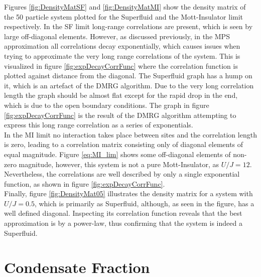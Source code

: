 Figures \ref{fig:DensityMatSF} and \ref{fig:DensityMatMI} show the density matrix of the 50 particle system plotted for the Superfluid and the Mott-Insulator limit respectively. In the SF limit long-range correlations are present, which is seen by large off-diagonal elements. However, as discussed previously, in the MPS approximation all correlations decay exponentially, which causes issues when trying to approximate the very long range correlations of the system. This is visualized in figure \ref{fig:expDecayCorrFunc} where the correlation function is plotted against distance from the diagonal. The Superfluid graph has a hump on it, which is an artefact of the DMRG algorithm. Due to the very long correlation length the graph should be almost flat except for the rapid drop in the end, which is due to the open boundary conditions. The graph in figure \ref{fig:expDecayCorrFunc} is the result of the DMRG algorithm attempting to express this long range correlation as a series of exponentials.\\
In the MI limit no interaction takes place between sites and the correlation length is zero,  leading to a correlation matrix consisting only of diagonal elements of equal magnitude. Figure \eqref{eq:MI_lim} shows some off-diagonal elements of non-zero magnitude, however, this system is not a pure Mott-Insulator, as $U/J = 12$. Nevertheless, the correlations are well described by only a single exponential function, as shown in figure \ref{fig:expDecayCorrFunc}.\\
Finally, figure \ref{fig:DensityMat05} illustrates the density matrix for a system with $U/J = 0.5$, which is primarily as Superfluid, although, as seen in the figure, has a well defined diagonal. Inspecting its correlation function reveals that the best approximation is by a power-law, thus confirming that the system is indeed a Superfluid. 


\section{Condensate Fraction}

